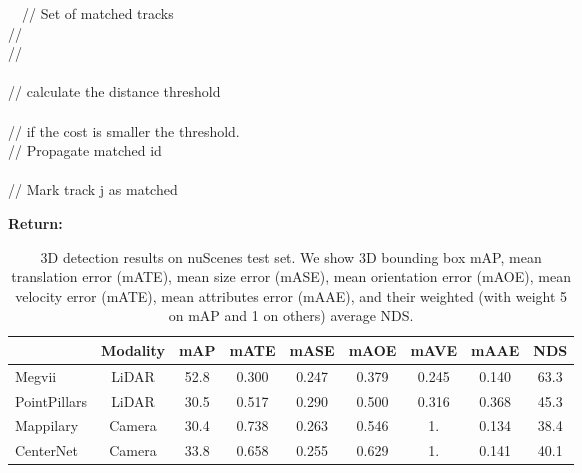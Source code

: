 \documentclass[runningheads]{llncs}
\newcommand{\lbltab}[1]{\label{tbl:#1}}
\begin{document}
{\begin{minipage}{0.52\textwidth}
\begin{algorithm}[H]
	 \ \ // Set of matched tracks \\
	//  \\
	//  \\
	\For{} {
		  \\
		 // calculate the distance threshold  \\ 
		  \\
		 // if the cost is smaller the threshold. \\
		 \If {} {
		    // Propagate matched id \\
		     \\
		     // Mark track j as matched \\
		 } 
	}
	
	\textbf{Return:} 
\end{algorithm}
\end{minipage}
}



\begin{table}[t]
    \begin{center}
    \begin{tabular} {l c c c c c c c c}
        \toprule
        & {Modality} & {mAP}  & {mATE}  & {mASE}  & {mAOE}  & {mAVE}  & {mAAE}  & {NDS}  \\
        \midrule
        Megvii \cite{zhu2019class} & LiDAR & 52.8 & {0.300} & 0.247 & {0.379} & {0.245} & 0.140 & {63.3} \\
        PointPillars \cite{lang2019pointpillars} & LiDAR & 30.5 & {0.517} & 0.290 & {0.500} & {0.316} & 0.368 & {45.3} \\
        Mappilary \cite{simonelli2019disentangling} & Camera & 30.4 & 0.738 & 0.263 & 0.546 & 1. & {0.134} & 38.4 \\
        CenterNet~\cite{zhou2019objects} & Camera & {33.8} & 0.658 & {0.255} & 0.629 & 1. & 0.141 & 40.1 \\
        \bottomrule
    \end{tabular}
    \end{center}
    \caption{3D detection results on nuScenes test set. We show 3D bounding box mAP, mean translation error (mATE), mean size error (mASE), mean orientation error (mAOE), mean velocity error (mATE), mean attributes error (mAAE), and their weighted (with weight 5 on mAP and 1 on others) average NDS.}
    \vspace{-5mm}
    \lbltab{nuscenesdet}
\end{table}
\end{document}
